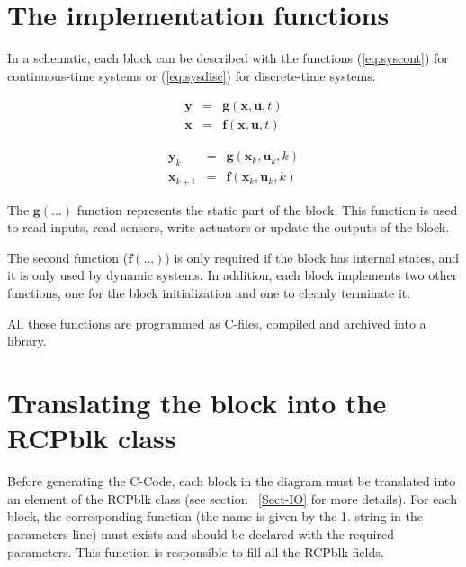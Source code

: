 \section{The implementation functions}

In a schematic, each block can be described with the functions 
(\ref{eq:syscont}) for continuous-time systems or (\ref{eq:sysdisc}) for 
discrete-time systems.

\begin{equation}
\label{eq:syscont}
\begin{array}{lll}
\mathbf{y} & = & \mathbf{g}(\mathbf{x},\mathbf{u},t) \\
\dot{\mathbf{x}} & = & \mathbf{f}(\mathbf{x},\mathbf{u},t) 
\end{array}
\end{equation}

\begin{equation}
\label{eq:sysdisc}
\begin{array}{lll}
\mathbf{y}_k & = & \mathbf{g}(\mathbf{x}_k,\mathbf{u}_k,k) \\
\mathbf{x}_{k+1} & = & \mathbf{f}(\mathbf{x}_k,\mathbf{u}_k,k) 
\end{array}
\end{equation}

The $\mathbf{g}(\ldots)$ function represents the static part of the block. 
This function is used to read inputs, read sensors, write actuators or 
update the outputs of the block.

The second function ($\mathbf{f}(\ldots)$) is only required if the block has 
internal states, and it is only used by dynamic systems. In 
addition, each block implements two other functions, one for the block 
initialization and one to cleanly terminate it.

All these functions are programmed as C-files, compiled and archived into a 
library.

\section{Translating the block into the RCPblk class}
Before generating the C-Code, each block in the diagram must be translated into 
an element of the RCPblk class (see section ~\ref{Sect-IO} for more details).
For each block, the corresponding function (the name is given by the 1. string 
in the parameters line) 
must exists and should be declared with the required parameters. This function 
is responsible to fill all the RCPblk fields.

